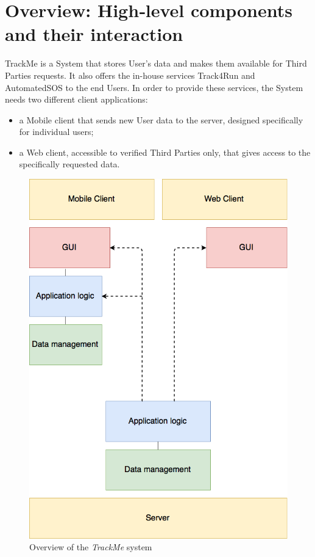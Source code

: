 \section{Overview: High‐level components and their interaction}

TrackMe is a System that stores User's data and makes them available for Third Parties requests. It also offers the in-house services Track4Run and AutomatedSOS to the end Users. In order to provide these services, the System needs two different client applications: 

\begin{itemize}[leftmargin=*]
        \item{a Mobile client that sends new User data to the server, designed specifically for individual users;}
        \item{a Web client, accessible to verified Third Parties only, that gives access to the specifically requested data.}
\end{itemize}

\begin{figure}[H]
\includegraphics[scale=0.3,keepaspectratio]{./Pictures/arch-design.png}
\centering
\caption{Overview of the \textit{TrackMe} system}
\end{figure}

